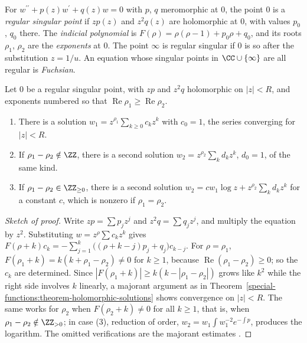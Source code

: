 \begin{definition}\label{special-functions:definition-regular-singular}
For $w^{\prime\prime} + p(z)w^{\prime} + q(z)w = 0$ with $p$, $q$ meromorphic at $0$, the point $0$ is a \emph{regular singular point} if $zp(z)$ and $z^2q(z)$ are holomorphic at $0$, with values $p_0$, $q_0$ there. The
\emph{indicial polynomial} is $F(\rho) = \rho(\rho - 1) + p_0\rho + q_0$, and its roots $\rho_1$, $\rho_2$ are the \emph{exponents} at $0$. The point $\infty$ is regular singular if $0$ is so after the substitution $z = 1/u$.
An equation whose singular points in $\CC \cup \{\infty\}$ are all regular is \emph{Fuchsian}.
\end{definition}

\begin{theorem}[Frobenius]\label{special-functions:theorem-frobenius}
Let $0$ be a regular singular point, with $zp$ and $z^2q$ holomorphic on $|z| < R$, and exponents numbered so that $\operatorname{Re}\rho_1 \geq \operatorname{Re}\rho_2$.
\begin{enumerate}
\item There is a solution $w_1 = z^{\rho_1}\sum_{k \geq 0}c_kz^k$ with $c_0 = 1$, the series converging for $|z| < R$.
\item If $\rho_1 - \rho_2 \notin \ZZ$, there is a second solution $w_2 = z^{\rho_2}\sum_kd_kz^k$, $d_0 = 1$, of the same kind.
\item If $\rho_1 - \rho_2 \in \ZZ_{\geq 0}$, there is a second solution $w_2 = cw_1\log z + z^{\rho_2}\sum_kd_kz^k$ for a constant $c$, which is nonzero if $\rho_1 = \rho_2$.
\end{enumerate}
\end{theorem}

\begin{proof}[Sketch of proof]
Write $zp = \sum p_jz^j$ and $z^2q = \sum q_jz^j$, and multiply the equation by $z^2$. Substituting $w = z^\rho\sum c_kz^k$ gives $F(\rho + k)c_k = -\sum_{j=1}^{k}\bigl((\rho + k - j)p_j + q_j\bigr)c_{k-j}$. For
$\rho = \rho_1$, $F(\rho_1 + k) = k(k + \rho_1 - \rho_2) \neq 0$ for $k \geq 1$, because $\operatorname{Re}(\rho_1 - \rho_2) \geq 0$; so the $c_k$ are determined. Since $|F(\rho_1 + k)| \geq k(k - |\rho_1 - \rho_2|)$ grows like $k^2$
while the right side involves $k$ linearly, a majorant argument as in Theorem~\ref{special-functions:theorem-holomorphic-solutions} shows convergence on $|z| < R$. The same works for $\rho_2$ when $F(\rho_2 + k) \neq 0$ for all
$k \geq 1$, that is, when $\rho_1 - \rho_2 \notin \ZZ_{>0}$; in case (3), reduction of order, $w_2 = w_1\int w_1^{-2}e^{-\int p}$, produces the logarithm. The omitted verifications are the majorant estimates
\cite{whittaker-watson}.
\end{proof}

